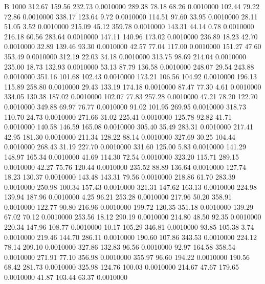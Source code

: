 


B 1000
 312.67  159.56  232.73   0.0010000
 289.38   78.18   68.26   0.0010000
 102.44   79.22   72.86   0.0010000
 338.17  123.64    9.72   0.0010000
 114.51   97.60   33.95   0.0010000
  28.11   51.05    3.52   0.0010000
 215.09   45.12  359.78   0.0010000
 143.31   44.14    0.78   0.0010000
 216.18   60.56  283.64   0.0010000
 147.11  140.96  173.02   0.0010000
 236.89   18.23   42.70   0.0010000
  32.89  139.46   93.30   0.0010000
  42.57   77.04  117.00   0.0010000
 151.27   47.60  353.49   0.0010000
 312.19   22.03   34.18   0.0010000
 313.75   98.69  214.04   0.0010000
 235.00   18.73  132.93   0.0010000
  53.13   87.79  136.58   0.0010000
 248.07   29.54  243.88   0.0010000
 351.16  101.68  102.43   0.0010000
 173.21  106.56  104.92   0.0010000
 196.13  115.89  258.80   0.0010000
  29.43  133.19  174.18   0.0010000
  87.47   77.30    4.61   0.0010000
 334.05  130.38  187.02   0.0010000
 102.07   77.83  257.28   0.0010000
  47.21   78.20  122.70   0.0010000
 349.88   69.97   76.77   0.0010000
  91.02  101.95  269.95   0.0010000
 318.73  110.70   24.73   0.0010000
 271.66   31.02  225.41   0.0010000
 125.78   92.82   41.71   0.0010000
 140.58  146.59  165.08   0.0010000
 305.40   35.49  283.31   0.0010000
 217.41   42.95  181.30   0.0010000
 211.34  128.22   88.14   0.0010000
 327.69   30.25  104.44   0.0010000
 268.43   31.19  227.70   0.0010000
 331.60  125.00    5.83   0.0010000
 141.29  148.97  165.34   0.0010000
  41.69  114.30   72.54   0.0010000
 323.20  115.71  289.15   0.0010000
  42.27   75.76  120.44   0.0010000
 235.52   88.89  136.64   0.0010000
 127.74   18.23  130.37   0.0010000
 143.48  143.31   79.56   0.0010000
 218.86   61.70  283.39   0.0010000
 250.98  100.34  157.43   0.0010000
 321.31  147.62  163.13   0.0010000
 224.98  139.94  187.96   0.0010000
   4.25   96.21  253.28   0.0010000
 217.96   50.20  358.91   0.0010000
 122.77   90.80  216.96   0.0010000
 199.72  120.35  351.18   0.0010000
 139.29   67.02   70.12   0.0010000
 253.56   18.12  290.19   0.0010000
 214.80   48.50   92.35   0.0010000
 220.34  147.96  108.77   0.0010000
  10.17  105.29  346.81   0.0010000
  93.85  105.38    3.74   0.0010000
 219.46  144.70  286.11   0.0010000
 190.60  107.86  343.53   0.0010000
 224.12   78.14  209.10   0.0010000
 327.86  132.83   96.56   0.0010000
  92.97  164.58  358.54   0.0010000
 271.91   77.10  356.98   0.0010000
 355.97   96.60  194.22   0.0010000
 190.56   68.42  281.73   0.0010000
 325.98  124.76  100.03   0.0010000
 214.67   47.67  179.65   0.0010000
  41.87  103.44   63.37   0.0010000
